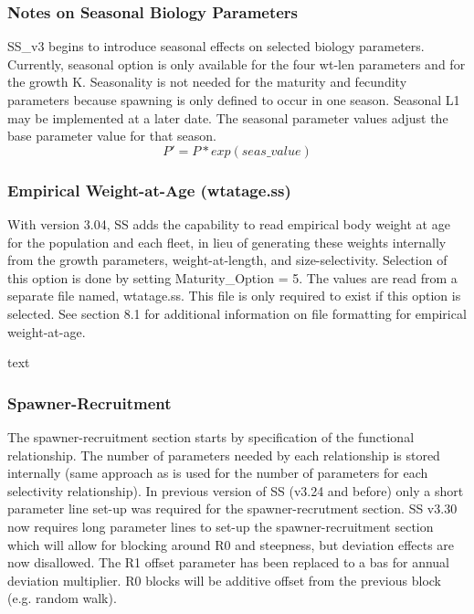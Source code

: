 \hypertarget{SeasGrowth}{}
\subsubsection{Notes on Seasonal Biology Parameters}
SS\_v3 begins to introduce seasonal effects on selected biology parameters.  Currently, seasonal option is only available for the four wt-len parameters and for the growth K.  Seasonality is not needed for the maturity and fecundity parameters because spawning is only defined to occur in one season.  Seasonal L1 may be implemented at a later date.  The seasonal parameter values adjust the base parameter value for that season.
\begin{equation}
P'=P*exp(seas\_value)
\end{equation}

\hypertarget{WAA}{}
\subsubsection{Empirical Weight-at-Age (wtatage.ss)}
With version 3.04, SS adds the capability to read empirical body weight at age for the population and each fleet, in lieu of generating these weights internally from the growth parameters, weight-at-length, and size-selectivity.  Selection of this option is done by setting Maturity\_Option = 5.  The values are read from a separate file named, wtatage.ss.  This file is only required to exist if this option is selected.  See section 8.1 for additional information on file formatting for empirical weight-at-age.

\hypertarget{SRR}{text}
\subsubsection{Spawner-Recruitment}
The spawner-recruitment section starts by specification of the functional relationship.  The number of parameters needed by each relationship is stored internally (same approach as is used for the number of parameters for each selectivity relationship).  In previous version of SS (v3.24 and before) only a short parameter line set-up was required for the spawner-recrutment section. SS v3.30 now requires long parameter lines to set-up the spawner-recruitment section which will allow for blocking around R0 and steepness, but deviation effects are now disallowed.  The R1 offset parameter has been replaced to a bas for annual deviation multiplier.  R0 blocks will be additive offset from the previous block (e.g. random walk). 

